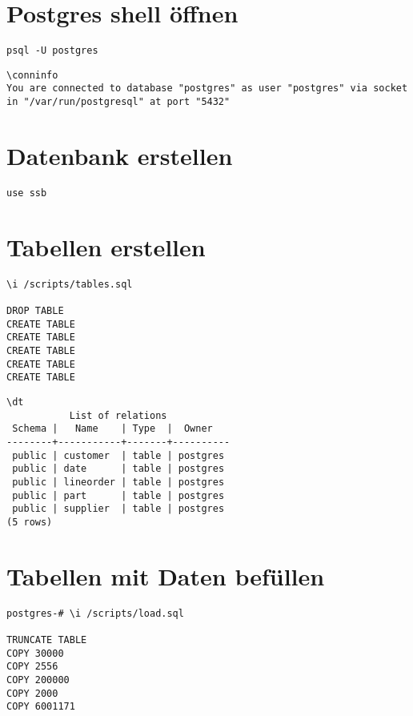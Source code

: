 \section{Postgres shell öffnen}
\begin{lstlisting}[language=terminal, caption=Postgres Shell öffnen, label=code:postgresopen]
psql -U postgres
\end{lstlisting}

\begin{lstlisting}[language=terminal, caption=Verbindungsinformationen, label=code:conninfo]
\conninfo
You are connected to database "postgres" as user "postgres" via socket in "/var/run/postgresql" at port "5432"
\end{lstlisting}

\section{Datenbank erstellen}
\begin{lstlisting}[language=terminal, caption=Datenbank erstellen, label=code:createdb]
use ssb
\end{lstlisting}

\section{Tabellen erstellen}
\begin{lstlisting}[language=terminal, caption=Tabellen erstellen, label=code:createtables]
\i /scripts/tables.sql

DROP TABLE
CREATE TABLE
CREATE TABLE
CREATE TABLE
CREATE TABLE
CREATE TABLE
\end{lstlisting}

\begin{lstlisting}[language=terminal, caption=Liste der Tabellen, label=code:listtables]
\dt
           List of relations
 Schema |   Name    | Type  |  Owner
--------+-----------+-------+----------
 public | customer  | table | postgres
 public | date      | table | postgres
 public | lineorder | table | postgres
 public | part      | table | postgres
 public | supplier  | table | postgres
(5 rows)
\end{lstlisting}

\section{Tabellen mit Daten befüllen}
\begin{lstlisting}[language=terminal, caption=Tabellen mit Daten befüllen, label=code:loaddata]
postgres-# \i /scripts/load.sql

TRUNCATE TABLE
COPY 30000
COPY 2556
COPY 200000
COPY 2000
COPY 6001171
\end{lstlisting}

